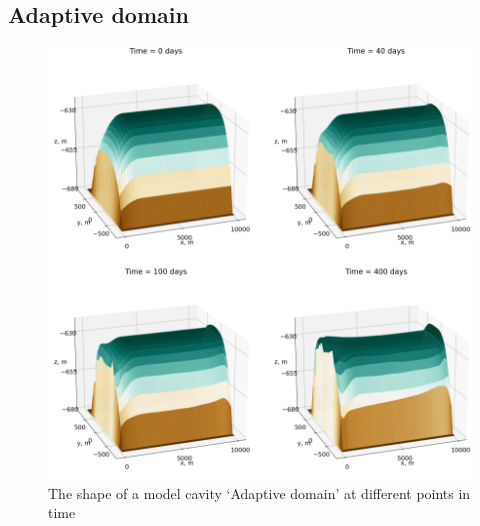 

\subsection{Adaptive domain} \label{sec:adaptive_dom_results}


\begin{figure}[!ht]
\centering
\includegraphics[width=1\textwidth]{chapters/4/adaptive_domain.png}
\caption[Adaptive domain]{The shape of a model cavity `Adaptive domain' at different points in time}
\label{fig:adaptive_domain}
\end{figure}

